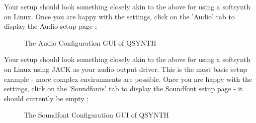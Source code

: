 \documentclass[letterpaper]{report}
\begin{document}
Your setup should look something closely akin to the above for using
a softsynth on Linux. Once you are happy with the settings, click on
the 'Audio' tab to display the Audio setup page ;



\begin{figure}
\caption{The Audio Configuration GUI of QSYNTH}
\end{figure}



Your setup should look something closely akin to the above for using
a softsynth on Linux using JACK as your audio output driver. This is
the most basic setup example - more complex environments are possible.
Once you are happy with the settings, click on the 'Soundfonts' tab to
display the Soundfont setup page - it should currently be empty ;


\begin{figure}
\caption{The Soundfont Configuration GUI of QSYNTH}
\end{figure}
\end{document}
